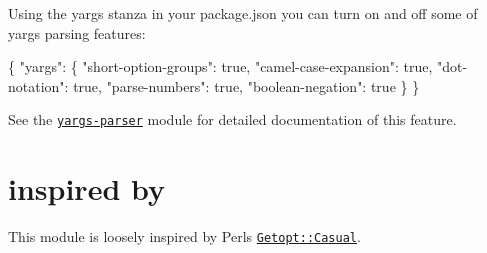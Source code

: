 Using the {\ttfamily yargs} stanza in your {\ttfamily package.\+json} you can turn on and off some of yargs\textquotesingle{} parsing features\+:


\begin{DoxyCode}
\{
  "yargs": \{
    "short-option-groups": true,
    "camel-case-expansion": true,
    "dot-notation": true,
    "parse-numbers": true,
    "boolean-negation": true
  \}
\}
\end{DoxyCode}


See the \href{https://github.com/yargs/yargs-parser#configuration}{\tt yargs-\/parser} module for detailed documentation of this feature.

\section*{inspired by }

This module is loosely inspired by Perl\textquotesingle{}s \href{http://search.cpan.org/~photo/Getopt-Casual-0.13.1/Casual.pm}{\tt Getopt\+::\+Casual}. 
